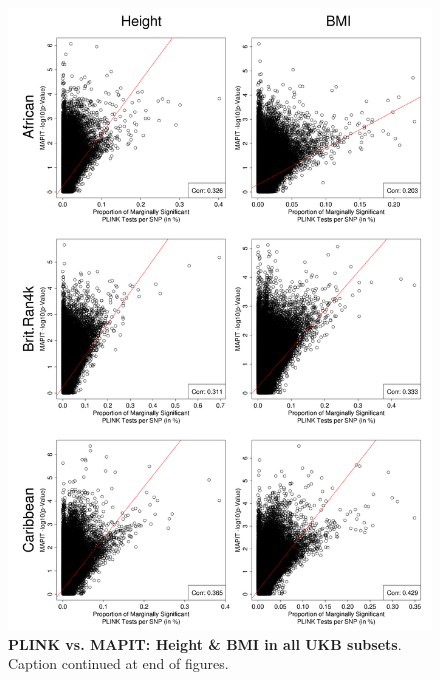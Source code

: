 \documentclass[12pt, a4paper]{article}
\begin{document}
\setlength{\footskip}{3cm}
\begin{figure}[htbp]
\centering
\vspace*{-2cm}
\includegraphics[scale=.3]{Images/Supp/InterPath_Supp_Figure_PLINKvsMAPIT_vs3_AllPops_HeightBMI_pt1.png}
\caption[TBD]{\textbf{PLINK vs. MAPIT: Height \& BMI in all UKB subsets}. Caption continued at end of figures.}
\label{InterPath-Supp-Figure-MAPITvsPLINK-HeightBMI-AllPops-a}
\end{figure}
\clearpage
\setlength{\footskip}{1cm}
\addtocounter{figure}{-1}
\end{document}
